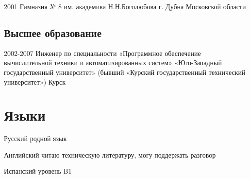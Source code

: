 \documentclass[11pt,a4paper,sans]{moderncv}
\newcommand{\lang}[2]{#1}
\begin{document}
\cventry
    {2001}
    {\lang
        {Гимназия № 8 им. академика Н.Н.Боголюбова}
        {TODO}}
    {\lang
        {г. Дубна Московской области}
        {Dubna}}
    {}
    {}
    {}


\subsection
    {\lang
        {Высшее образование}
        {Higher Education}}

\cventry
    {2002-2007}
    {\lang
        {Инженер по специальности «Программное обеспечение вычислительной техники и автоматизированных систем»}
        {Software of computer facilities and automated systems}}
    {\lang
        {«Юго-Западный государственный университет» (бывший «Курский государственный технический университет»)}
        {South-West State University (ex. Kursk State Technical University)}}
    {\lang
        {Курск}
        {Kursk}}
    {}
    {}

\section
    {\lang
        {Языки}
        {Language Skills}}

\cvlanguage
    {\lang
        {Русский}
        {Russian}}
    {\lang
        {родной язык}
        {Native speaker}}
    {}

\cvlanguage
    {\lang
        {Английский}
        {English}}
    {\lang
        {читаю техническую литературу, могу поддержать разговор}
        {Good reading and translating ability}}
    {}

\cvlanguage
    {\lang
        {Испанский}
        {Spanish}}
    {\lang
        {уровень B1}
        {Nivel B1}}
    {}
\end{document}
